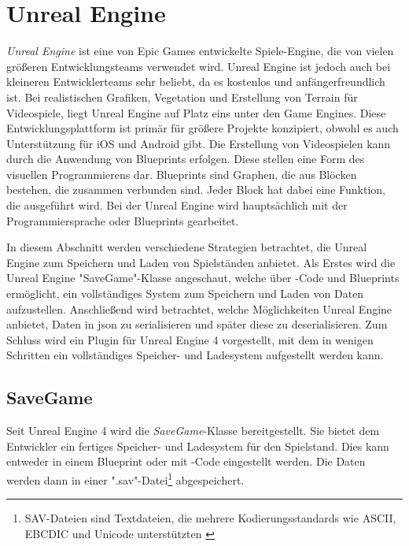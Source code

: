 \section{Unreal Engine}
\textit{Unreal Engine} ist eine von Epic Games entwickelte Spiele-Engine, die von vielen größeren Entwicklungsteams verwendet wird.\cite{linkedinUnrealEngine} Unreal Engine ist jedoch auch bei kleineren Entwicklerteams sehr beliebt, da es kostenlos und anfängerfreundlich ist. Bei realistischen Grafiken, Vegetation und Erstellung von Terrain für Videospiele, liegt Unreal Engine auf Platz eins unter den Game Engines.\cite{vsmid2017comparison} Diese Entwicklungsplattform ist primär für größere Projekte konzipiert, obwohl es auch Unterstützung für iOS und Android gibt. Die Erstellung von Videospielen kann durch die Anwendung von Blueprints erfolgen. Diese stellen eine Form des visuellen Programmierens dar. Blueprints sind Graphen, die aus Blöcken bestehen, die zusammen verbunden sind. Jeder Block hat dabei eine Funktion, die ausgeführt wird. Bei der Unreal Engine wird hauptsächlich mit der Programmiersprache \cpp{} oder Blueprints gearbeitet.\cite{vsmid2017comparison}

In diesem Abschnitt werden verschiedene Strategien betrachtet, die Unreal Engine zum Speichern und Laden von Spielständen anbietet. Als Erstes wird die Unreal Engine "SaveGame"-Klasse angeschaut, welche über \cpp{}-Code und Blueprints ermöglicht, ein vollständiges System zum Speichern und Laden von Daten aufzustellen. Anschließend wird betrachtet, welche Möglichkeiten Unreal Engine anbietet, Daten in \ac{json} zu serialisieren und später diese zu deserialisieren. Zum Schluss wird ein Plugin für Unreal Engine 4 vorgestellt, mit dem in wenigen Schritten ein vollständiges Speicher- und Ladesystem aufgestellt werden kann. 



\subsection{SaveGame}
Seit Unreal Engine 4 wird die \textit{SaveGame}-Klasse bereitgestellt. Sie bietet dem Entwickler ein fertiges Speicher- und Ladesystem für den Spielstand. Dies kann entweder in einem Blueprint oder mit \cpp{}-Code eingestellt werden. Die Daten werden dann in einer ".sav"-Datei\footnote{SAV-Dateien sind Textdateien, die mehrere Kodierungsstandards wie ASCII, EBCDIC und Unicode unterstützten \cite{filextSavDatei}} abgespeichert.\cite{unrealengineSavingLoading}

